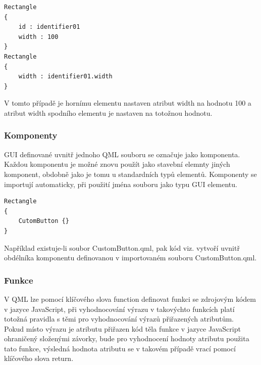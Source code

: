 \documentclass[report,11pt]{elsarticle}
\begin{document}
\begin{lstlisting}[frame=single,caption=Ukázka použití atributu id.]
Rectangle
{
	id : identifier01
	width : 100
}
Rectangle
{
	width : identifier01.width
}
\end{lstlisting}
V tomto případě je hornímu elementu nastaven atribut width na hodnotu 100 a atribut width spodního elementu je nastaven na totožnou hodnotu.

\subsubsection{Komponenty}
GUI definované uvnitř jednoho QML souboru se označuje jako komponenta. Každou komponentu je možné znovu použít jako stavební elemnty jiných komponent, obdobně jako je tomu u standardních typů elementů. Komponenty se importují automaticky, při použití jména souboru jako typu GUI elementu.

\begin{lstlisting}[frame=single,caption=Ukázka použití komponenty z jiného souboru.]
Rectangle
{
	CutomButton {}
}
\end{lstlisting}
Například existuje-li soubor CustomButton.qml, pak kód viz. vytvoří uvnitř obdélníka komponentu definovanou v importovaném souboru CustomButton.qml.

\subsubsection{Funkce}

V QML lze pomocí klíčového slova function definovat funkci se zdrojovým kódem v jazyce JavaScript, při vyhodnocování výrazu v takovýchto funkcích platí totožná pravidla s těmi pro vyhodnocování výrazů přiřazených atributům.\\
Pokud místo výrazu je atributu přiřazen kód těla funkce v jazyce JavaScript ohraničený složenými závorky, bude pro vyhodnocení hodnoty atributu použita tato funkce, výsledná hodnota atributu se v takovém případě vrací pomocí klíčového slova return.
\end{document}
